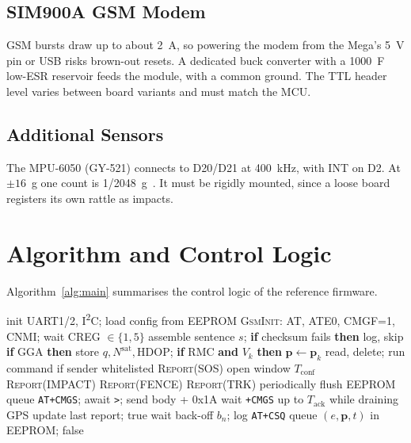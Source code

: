 \documentclass[conference]{IEEEtran}
\begin{document}
\subsection{SIM900A GSM Modem}
GSM bursts draw up to about 2~A, so powering the modem from the Mega's 5~V pin or USB risks brown-out resets. A dedicated buck converter with a 1000~\textmu F low-ESR reservoir feeds the module, with a common ground. The TTL header level varies between board variants and must match the MCU.

\subsection{Additional Sensors}
The MPU-6050 (GY-521) connects to D20/D21 at 400~kHz, with INT on D2. At $\pm16$~g one count is 1/2048~g~\cite{mpu6050}. It must be rigidly mounted, since a loose board registers its own rattle as impacts.

\section{Algorithm and Control Logic}\label{sec:alg}
Algorithm~\ref{alg:main} summarises the control logic of the reference firmware.

\begin{algorithm}[!t]
\caption{Main loop of the enhanced tracking node}
\label{alg:main}
\scriptsize
\begin{algorithmic}[1]
\State init UART1/2, I\textsuperscript{2}C; load config from EEPROM
\State \textsc{GsmInit}: AT, ATE0, CMGF=1, CNMI; wait CREG $\in\{1,5\}$
\Loop
   
    \State assemble sentence $s$; \textbf{if} checksum fails \textbf{then} log, skip
    \State \textbf{if} GGA \textbf{then} store $q, N^{\mathrm{sat}}, \mathrm{HDOP}$; \textbf{if} RMC \textbf{and} $V_k$ \textbf{then} $\mathbf{p}\gets\mathbf{p}_k$
  \EndWhile
   read, delete; run command if sender whitelisted \EndIf
   \textsc{Report}(SOS) \EndIf
   open window $T_{\mathrm{conf}}$ \EndIf
   \textsc{Report}(IMPACT) \EndIf
   \textsc{Report}(FENCE) \EndIf
   \textsc{Report}(TRK) \EndIf
  \State periodically flush EEPROM queue
\EndLoop
{}
    \State \texttt{AT+CMGS}; await \texttt{>}; send body + 0x1A
    \State wait \texttt{+CMGS} up to $T_{\mathrm{ack}}$ while draining GPS
     update last report; \Return true \EndIf
    \State wait back-off $b_n$; log \texttt{AT+CSQ}
  \EndFor
  \State queue $(e,\mathbf{p},t)$ in EEPROM; \Return false
\EndFunction
\end{algorithmic}
\end{algorithm}
\end{document}
